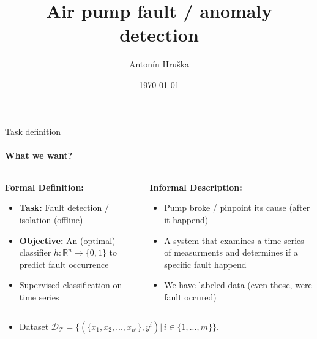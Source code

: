 \documentclass{beamer}
\title{Air pump fault / anomaly detection}
\author{Antonín Hruška}
\date{\today}
\begin{document}
\begin{frame}
    \titlepage
\end{frame}

\begin{frame}{Task definition}
    \framesubtitle{What we want?}
    
    \begin{columns}[T]
        \small
        \begin{column}{0.5\textwidth}
            \textbf{Formal Definition:}
            \begin{itemize}
                \item \textbf{Task:}  Fault detection / isolation (offline)
                \item \textbf{Objective:} An (optimal) classifier $h: \mathbb{R}^n  \to \{0, 1\}$ to predict fault occurrence
                \item Supervised classification on time series 
            \end{itemize}
        \end{column}
        
        \begin{column}{0.5\textwidth}
            \textbf{Informal Description:}
            \begin{itemize}
                \item Pump broke / pinpoint its cause (after it happend)
                \item A system that examines a time series of measurments and determines if a specific fault happend
                \item We have labeled data (even those, were fault occured) 
            \end{itemize}
        \end{column}
    \end{columns}

    \begin{itemize}
        \item Dataset $ \mathcal{D}_{\mathcal T} = \big\{ (\{x_1, x_2, ..., x_{n^i}\},y^i) |\,i \in \{1,...,m\} \big\}$.
    \end{itemize}
    

\end{frame}
\end{document}

